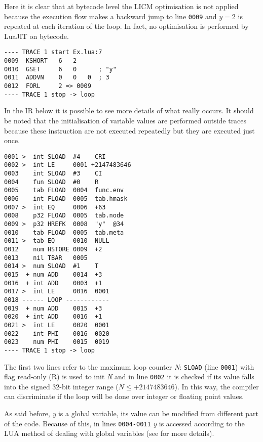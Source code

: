 Here it is clear that at bytecode level the LICM optimisation is not applied because the execution flow makes a backward jump to line \texttt{0009} and $y=2$ is repeated at each iteration of the loop. In fact, no optimisation is performed by LuaJIT on bytecode.

\begin{lstlisting}[style=DumpStyle]
---- TRACE 1 start Ex.lua:7
0009  KSHORT   6   2
0010  GSET     6   0      ; "y"
0011  ADDVN    0   0   0  ; 3
0012  FORL     2 => 0009
---- TRACE 1 stop -> loop
\end{lstlisting}

\noindent
In the IR below it is possible to see more details of what really occurs. It should be noted that the initialisation of variable values are performed outside traces because these instruction are not executed repeatedly but they are executed just once.

\begin{multicols}{2}
\begin{lstlisting}[style=DumpStyle]
0001 >  int SLOAD  #4    CRI
0002 >  int LE     0001 +2147483646
0003    int SLOAD  #3    CI
0004    fun SLOAD  #0    R
0005    tab FLOAD  0004  func.env
0006    int FLOAD  0005  tab.hmask
0007 >  int EQ     0006  +63 
0008    p32 FLOAD  0005  tab.node
0009 >  p32 HREFK  0008  "y"  @34
0010    tab FLOAD  0005  tab.meta
0011 >  tab EQ     0010  NULL
0012    num HSTORE 0009  +2  
0013    nil TBAR   0005
0014 >  num SLOAD  #1    T
0015  + num ADD    0014  +3  
0016  + int ADD    0003  +1  
0017 >  int LE     0016  0001
0018 ------ LOOP ------------
0019  + num ADD    0015  +3  
0020  + int ADD    0016  +1  
0021 >  int LE     0020  0001
0022    int PHI    0016  0020
0023    num PHI    0015  0019
---- TRACE 1 stop -> loop
\end{lstlisting}
\end{multicols} 

\noindent
The first two lines refer to the maximum loop counter \textit{N}: \texttt{SLOAD} (line \texttt{0001}) with flag read-only (R) is used to init \textit{N} and in line \texttt{0002} it is checked if its value falls into the signed 32-bit integer range ($N\leq+2147483646$). In this way, the compiler can discriminate if the loop will be done over integer or floating point values.

As said before, \textit{y} is a global variable, its value can be modified from different part of the code. Because of this, in lines \texttt{0004-0011} \textit{y} is accessed according to the LUA method of dealing with global variables (see \cite{lua-ref-man} for more details).

